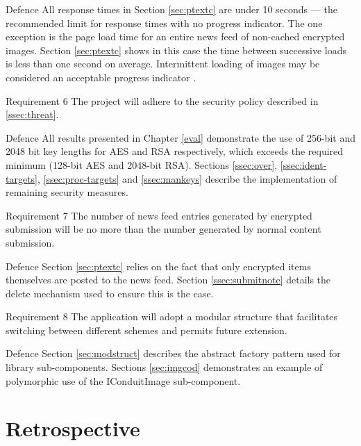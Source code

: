 \begin{desc}
    \item[Defence] All response times in Section \ref{sec:ptextc} are under 10 seconds --- the recommended limit for response times with no progress indicator. The one exception is the page load time for an entire news feed of non-cached encrypted images. Section \ref{sec:ptextc} shows in this case the time between successive loads is less than one second on average. Intermittent loading of images may be considered an acceptable progress indicator \cite{response}.

    \item[Requirement 6] The project will adhere to the security policy described in \ref{ssec:threat}.
    
    \item[Defence] All results presented in Chapter \ref{eval} demonstrate the use of 256-bit and 2048 bit key lengths for AES and RSA respectively, which exceeds the required minimum (128-bit AES and 2048-bit RSA). Sections \ref{ssec:over}, \ref{ssec:ident-targets}, \ref{ssec:proc-targets} and \ref{ssec:mankeys} describe the implementation of remaining security measures.

    \item[Requirement 7] The number of news feed entries generated by encrypted submission will be no more than the number generated by normal content submission.
    
    \item[Defence] Section \ref{sec:ptextc} relies on the fact that only encrypted items themselves are posted to the news feed. Section \ref{ssec:submitnote} details the delete mechanism used to ensure this is the case.
    

    \item[Requirement 8] The application will adopt a modular structure that facilitates switching between different schemes and permits future extension.
    
    \item[Defence] Section \ref{sec:modstruct} describes the abstract factory pattern used for library sub-components. Sections \ref{sec:imgcod} demonstrates an example of polymorphic use of the IConduitImage sub-component.
    
\end{desc}



\section{Retrospective}
\label{sec:retro}

